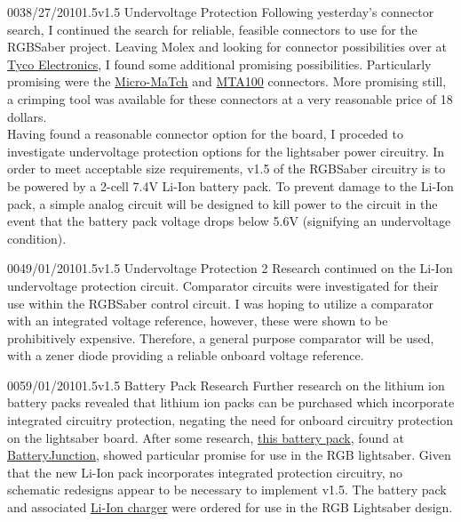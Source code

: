 \documentclass[12pt,letterpaper,onecolumn]{article}
\begin{document}
\begin{nbentry}{003}{8/27/2010}{1.5}{v1.5 Undervoltage Protection}
\indent Following yesterday's connector search, I continued the search for reliable, feasible connectors to use for the RGBSaber project. Leaving Molex and looking for connector possibilities over at \href{http://tycoelectronics.com}{Tyco Electronics}, I found some additional promising possibilities. Particularly promising were the \href{http://www.tycoelectronics.com/catalog/feat/en/c/11398?BML=10576,17560,23645,17587}{Micro-MaTch} and \href{http://www.tycoelectronics.com/catalog/feat/en/s/23478?BML=10576,17560,23645,17587}{MTA100} connectors. More promising still, a crimping tool was available for these connectors at a very reasonable price of 18 dollars. \\
\indent Having found a reasonable connector option for the board, I proceded to investigate undervoltage protection options for the lightsaber power circuitry. In order to meet acceptable size requirements, v1.5 of the RGBSaber circuitry is to be powered by a 2-cell 7.4V Li-Ion battery pack. To prevent damage to the Li-Ion pack, a simple analog circuit will be designed to kill power to the circuit in the event that the battery pack voltage drops below 5.6V (signifying an undervoltage condition).
\end{nbentry}

\begin{nbentry}{004}{9/01/2010}{1.5}{v1.5 Undervoltage Protection 2}
\indent Research continued on the Li-Ion undervoltage protection circuit. Comparator circuits were investigated for their use within the RGBSaber control circuit. I was hoping to utilize a comparator with an integrated voltage reference, however, these were shown to be prohibitively expensive. Therefore, a general purpose comparator will be used, with a zener diode providing a reliable onboard voltage reference.
\end{nbentry}

\begin{nbentry}{005}{9/01/2010}{1.5}{v1.5 Battery Pack Research}
\indent Further research on the lithium ion battery packs revealed that lithium ion packs can be purchased which incorporate integrated circuitry protection, negating the need for onboard circuitry protection on the lightsaber board. After some research, \href{http://www.batteryjunction.com/tenergy-18650-2200-pk.html}{this battery pack}, found at \href{http://www.batteryjunction.com/}{BatteryJunction}, showed particular promise for use in the RGB lightsaber.
\indent Given that the new Li-Ion pack incorporates integrated protection circuitry, no schematic redesigns appear to be necessary to implement v1.5. The battery pack and associated \href{http://www.batteryjunction.com/unsmchforlib.html}{Li-Ion charger} were ordered for use in the RGB Lightsaber design.
\end{nbentry}
\end{document}
